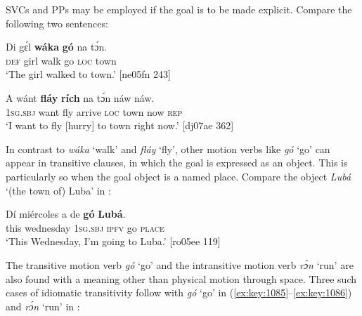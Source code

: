 \z


\z

\newpage 
SVCs and PPs may be employed if the goal is to be made explicit. Compare the following two sentences:


\ea%
    \label{ex:key:1082}
    \gll Di  gɛ́l    \textbf{wáka}  \textbf{gó}  na  tɔ́n.\\
\textsc{def}  girl    walk  go  \textsc{loc}  town\\

\glt ‘The girl walked to town.’ [ne05fn 243]
\z


\ea%
    \label{ex:key:1083}
    \gll A    wánt  \textbf{fláy}  \textbf{rích}    na  tɔ́n   náw    náw.\\
\textsc{1sg.sbj}  want  fly  arrive  \textsc{loc}  town  now    \textsc{rep}\\

\glt ‘I want to fly [hurry] to town right now.’ [dj07ae 362]
\z

In contrast to \textit{wáka} ‘walk’ and \textit{fláy} ‘fly’, other motion verbs like \textit{gó} ‘go’ can appear in transitive clauses, in which the goal is expressed as an object. This is particularly so when the goal object is a named place. Compare the object \textit{Lubá} ‘(the town of) Luba’ in :


\ea%
    \label{ex:key:1084}
    \gll Dí  miércoles  a      de  \textbf{gó}  \textbf{Lubá}.\\
this  wednesday  \textsc{1sg.sbj}    \textsc{ipfv}  go  \textsc{place}\\

\glt ‘This Wednesday, I’m going to Luba.’ [ro05ee 119]
\z


The transitive motion verb \textit{gó} ‘go’ and the intransitive motion verb \textit{rɔ́n} ‘run’ are also found with a meaning other than physical motion through space. Three such cases of idiomatic transitivity follow with \textit{gó} ‘go’ in (\ref{ex:key:1085}–\ref{ex:key:1086}) and \textit{rɔ́n} ‘run’ in :


